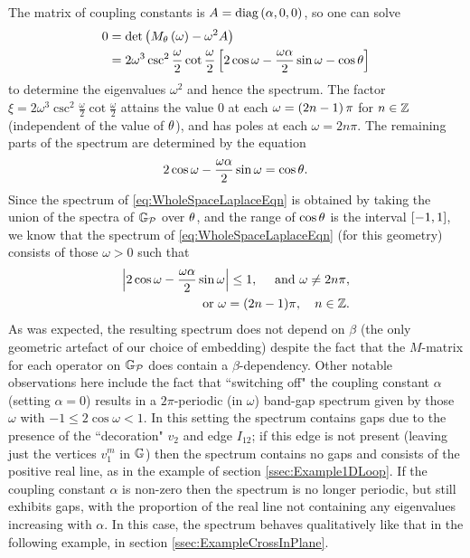 The matrix of coupling constants is $A=\mathrm{diag}\left( \alpha, 0, 0 \right)$, so one can solve
\begin{align*}
	0 &= \det\left( M_{\theta}\left( \omega \right) - \omega^2 A \right) \\
	&= 2\omega^3\csc^2\frac{\omega}{2}\cot\frac{\omega}{2}\left[  2\cos\omega - \frac{\omega\alpha}{2}\sin\omega - \cos\theta \right]
\end{align*}
to determine the eigenvalues $\omega^2$ and hence the spectrum.
The factor $\xi = 2\omega^3\csc^2\frac{\omega}{2}\cot\frac{\omega}{2}$ attains the value 0 at each $\omega=\left( 2n-1 \right)\pi$ for $n\in\mathbb{Z}$ (independent of the value of $\theta$), and has poles at each $\omega=2n\pi$.
The remaining parts of the spectrum are determined by the equation
\begin{align*}
	2\cos\omega - \frac{\omega\alpha}{2}\sin\omega = \cos\theta.
\end{align*}
Since the spectrum of \eqref{eq:WholeSpaceLaplaceEqn} is obtained by taking the union of the spectra of $\mathbb{G}_{\mathcal{P}}$ over $\theta$, and the range of $\cos\theta$ is the interval $\left[ -1,1 \right]$, we know that the spectrum of \eqref{eq:WholeSpaceLaplaceEqn} (for this geometry) consists of those $\omega>0$ such that
\begin{align*}
	\left\lvert  2\cos\omega - \frac{\omega\alpha}{2}\sin\omega \right\rvert \leq 1, 
	\quad\text{ and }\omega\neq 2n\pi, \\
	\text{or} \ \omega= (2n-1)\pi, \quad n\in\mathbb{Z}.
\end{align*}
As was expected, the resulting spectrum does not depend on $\beta$ (the only geometric artefact of our choice of embedding) despite the fact that the $M$-matrix for each operator on $\mathbb{G}_{\mathcal{P}}$ does contain a $\beta$-dependency.
Other notable observations here include the fact that ``switching off" the coupling constant $\alpha$ (setting $\alpha=0$) results in a $2\pi$-periodic (in $\omega$) band-gap spectrum given by those $\omega$ with $-1\leq 2\cos\omega < 1$.
In this setting the spectrum contains gaps due to the presence of the ``decoration" $v_2$ and edge $I_{12}$; if this edge is not present (leaving just the vertices $v_1^m$ in $\mathbb{G}$) then the spectrum contains no gaps and consists of the positive real line, as in the example of section \ref{ssec:Example1DLoop}.
If the coupling constant $\alpha$ is non-zero then the spectrum is no longer periodic, but still exhibits gaps, with the proportion of the real line not containing any eigenvalues increasing with $\alpha$.
In this case, the spectrum behaves qualitatively like that in the following example, in section \ref{ssec:ExampleCrossInPlane}.

